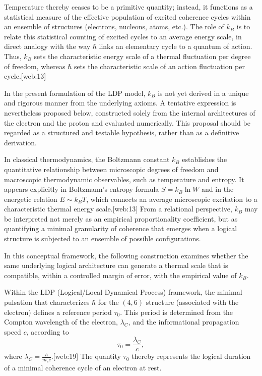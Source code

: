 \documentclass[11pt,a4paper]{article}
\begin{document}
Temperature thereby ceases to be a primitive quantity; instead, it functions as a statistical measure of the effective population of excited coherence cycles within an ensemble of structures (electrons, nucleons, atoms, etc.). The role of \(k_B\) is to relate this statistical counting of excited cycles to an average energy scale, in direct analogy with the way \(\hbar\) links an elementary cycle to a quantum of action. Thus, \(k_B\) sets the characteristic energy scale of a thermal fluctuation per degree of freedom, whereas \(\hbar\) sets the characteristic scale of an action fluctuation per cycle.[web:13]

In the present formulation of the LDP model, \(k_B\) is not yet derived in a unique and rigorous manner from the underlying axioms. A tentative expression is nevertheless proposed below, constructed solely from the internal architectures of the electron and the proton and evaluated numerically. This proposal should be regarded as a structured and testable hypothesis, rather than as a definitive derivation.

In classical thermodynamics, the Boltzmann constant \(k_B\) establishes the quantitative relationship between microscopic degrees of freedom and macroscopic thermodynamic observables, such as temperature and entropy. It appears explicitly in Boltzmann’s entropy formula \(S = k_B \ln W\) and in the energetic relation \(E \sim k_B T\), which connects an average microscopic excitation to a characteristic thermal energy scale.[web:13] From a relational perspective, \(k_B\) may be interpreted not merely as an empirical proportionality coefficient, but as quantifying a minimal granularity of coherence that emerges when a logical structure is subjected to an ensemble of possible configurations.

In this conceptual framework, the following construction examines whether the same underlying logical architecture can generate a thermal scale that is compatible, within a controlled margin of error, with the empirical value of \(k_B\).

Within the LDP (Logical/Local Dynamical Process) framework, the minimal pulsation that characterizes \(\hbar\) for the \((4,6)\) structure (associated with the electron) defines a reference period \(\tau_0\). This period is determined from the Compton wavelength of the electron, \(\lambda_C\), and the informational propagation speed \(c\), according to
\[
\tau_0 = \frac{\lambda_C}{c},
\]
where \(\lambda_C = \frac{h}{m_e c}\).[web:19] The quantity \(\tau_0\) thereby represents the logical duration of a minimal coherence cycle of an electron at rest.
\end{document}
